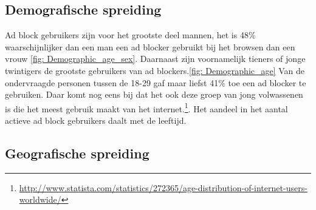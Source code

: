 \documentclass[pdftex,a4paper,12pt,twoside]{report}
\begin{document}
\subsection{Demografische spreiding}
\label{sec Demografische spreiding}
Ad block gebruikers zijn voor het grootste deel mannen, het is 48\% waarschijnlijker dan een man een ad blocker gebruikt bij het browsen dan een vrouw \ref{fig: Demographic_age_sex}. Daarnaast zijn voornamelijk tieners of jonge twintigers de grootste gebruikers van ad blockers.\ref{fig: Demographic_age} Van de ondervraagde personen tussen de 18-29 gaf maar liefst 41\% toe een ad blocker te gebruiken. Daar komt nog eens bij dat het ook deze groep van jong volwassenen is die het meest gebruik maakt van het internet.\footnote{\url{http://www.statista.com/statistics/272365/age-distribution-of-internet-users-worldwide/}}. Het aandeel in het aantal actieve ad block gebruikers daalt met de leeftijd.
\subsection{Geografische spreiding}
\label{sec Geografische spreiding}
 
\end{document}
